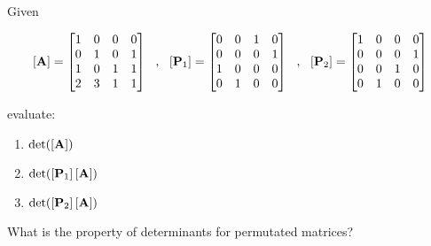 \bexo
Given

\begin{equation}
	\left[ \textbf{A} \right] = \begin{bmatrix}
		1& 0& 0& 0\\
		0& 1& 0& 1\\
		1& 0& 1& 1\\
		2& 3& 1& 1
	\end{bmatrix}
	~~,~~
	[\textbf{P}_1] = \begin{bmatrix}
		0& 0& 1& 0\\
		0& 0& 0& 1\\
		1& 0& 0& 0\\
		0& 1& 0& 0
	\end{bmatrix}
	~~,~~
	[\textbf{P}_2] = \begin{bmatrix}
		1& 0& 0& 0\\
		0& 0& 0& 1\\
		0& 0& 1& 0\\
		0& 1& 0& 0
	\end{bmatrix}
\end{equation}

evaluate:

\begin{enumerate}
	\item $\mathrm{det}([\textbf{A}])$
	\item $\mathrm{det}([\textbf{P}_1]\left[ \textbf{A} \right])$
	\item $\mathrm{det}([\textbf{P}_2]\left[ \textbf{A} \right])$
\end{enumerate}

What is the property of determinants for permutated matrices?
\eexo


